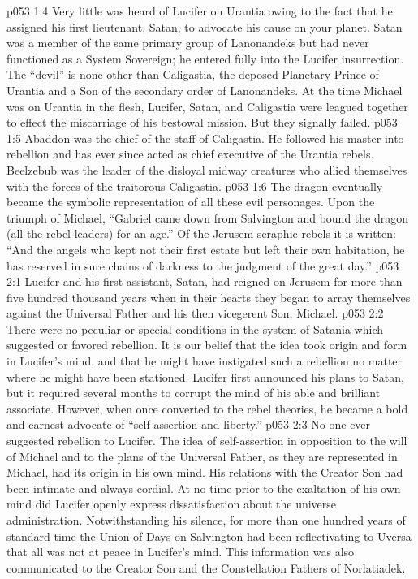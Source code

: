 \vs p053 1:4 Very little was heard of Lucifer on Urantia owing to the fact that he assigned his first lieutenant, Satan, to advocate his cause on your planet. Satan was a member of the same primary group of Lanonandeks but had never functioned as a System Sovereign; he entered fully into the Lucifer insurrection. The “devil” is none other than Caligastia, the deposed Planetary Prince of Urantia and a Son of the secondary order of Lanonandeks. At the time Michael was on Urantia in the flesh, Lucifer, Satan, and Caligastia were leagued together to effect the miscarriage of his bestowal mission. But they signally failed.
\vs p053 1:5 Abaddon was the chief of the staff of Caligastia. He followed his master into rebellion and has ever since acted as chief executive of the Urantia rebels. Beelzebub was the leader of the disloyal midway creatures who allied themselves with the forces of the traitorous Caligastia.
\vs p053 1:6 \pc The dragon eventually became the symbolic representation of all these evil personages. Upon the triumph of Michael, “Gabriel came down from Salvington and bound the dragon (all the rebel leaders) for an age.” Of the Jerusem seraphic rebels it is written: “And the angels who kept not their first estate but left their own habitation, he has reserved in sure chains of darkness to the judgment of the great day.”
\vs p053 2:1 Lucifer and his first assistant, Satan, had reigned on Jerusem for more than five hundred thousand years when in their hearts they began to array themselves against the Universal Father and his then vicegerent Son, Michael.
\vs p053 2:2 There were no peculiar or special conditions in the system of Satania which suggested or favored rebellion. It is our belief that the idea took origin and form in Lucifer’s mind, and that he might have instigated such a rebellion no matter where he might have been stationed. Lucifer first announced his plans to Satan, but it required several months to corrupt the mind of his able and brilliant associate. However, when once converted to the rebel theories, he became a bold and earnest advocate of “self\hyp{}assertion and liberty.”
\vs p053 2:3 \pc No one ever suggested rebellion to Lucifer. The idea of self\hyp{}assertion in opposition to the will of Michael and to the plans of the Universal Father, as they are represented in Michael, had its origin in his own mind. His relations with the Creator Son had been intimate and always cordial. At no time prior to the exaltation of his own mind did Lucifer openly express dissatisfaction about the universe administration. Notwithstanding his silence, for more than one hundred years of standard time the Union of Days on Salvington had been reflectivating to Uversa that all was not at peace in Lucifer’s mind. This information was also communicated to the Creator Son and the Constellation Fathers of Norlatiadek.
